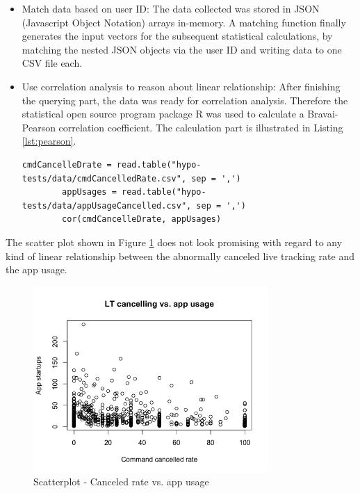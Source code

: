 \begin{enumerate}
\begin{itemize}
		\item Match data based on user ID: The data collected was stored in JSON (Javascript Object Notation) arrays in-memory. A matching function finally generates the input vectors for the subsequent statistical calculations, by matching the nested JSON objects via the user ID and writing data to one CSV file each. 
		\item Use correlation analysis to reason about linear relationship: After finishing the querying part, the data was ready for correlation analysis. Therefore the statistical open source program package R was used to calculate a Bravai-Pearson correlation coefficient. The calculation part is illustrated in Listing \ref{lst:pearson}. 
		
		\begin{lstlisting}[caption={Calculation of pearson correlation and statistical test in R}, label={lst:pearson}]
		cmdCancelleDrate = read.table("hypo-tests/data/cmdCancelledRate.csv", sep = ',')
		appUsages = read.table("hypo-tests/data/appUsageCancelled.csv", sep = ',')
		cor(cmdCancelleDrate, appUsages)
		\end{lstlisting}
	\end{itemize}

	The scatter plot shown in Figure \ref{fig:canceledvsAppUsage} does not look promising with regard to any kind of linear relationship between the abnormally canceled live tracking rate and the app usage. 
	
	\begin{figure}
		\centering
		\includegraphics[width=0.8\textwidth]{img/LT_cancelled_rate_vs_app_usage.png}
		\caption{Scatterplot - Canceled rate vs. app usage}
		\label{fig:canceledvsAppUsage}
	\end{figure} 
	

\end{enumerate}
